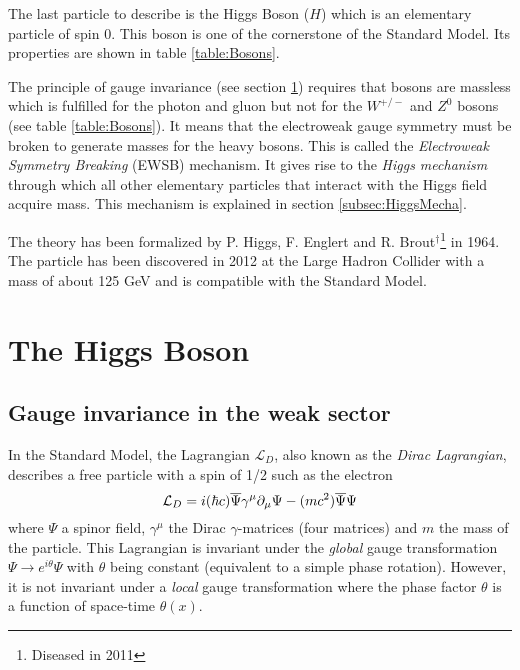 The last particle to describe is the Higgs Boson ($H$) which is an elementary particle of spin 0. This boson is one of the cornerstone of the Standard Model. Its properties are shown in table \ref{table:Bosons}.

The principle of gauge invariance (see section \ref{sec:HiggsTheo}) requires that bosons are massless which is fulfilled for the photon and gluon but not for the $W^{+/-}$ and $Z^0$ bosons (see table \ref{table:Bosons}). It means that the electroweak gauge symmetry must be broken to generate masses for the heavy bosons. This is called the \textit{Electroweak Symmetry Breaking} (EWSB) mechanism. It gives rise to the \textit{Higgs mechanism} through which all other elementary particles that interact with the Higgs field acquire mass. This mechanism is explained in section \ref{subsec:HiggsMecha}.

The theory \cite{Higgs:1964pj, Englert:1964et} has been formalized by P. Higgs, F. Englert and R. Brout$^\dagger$\footnote{Diseased in 2011} in 1964. The particle has been discovered in 2012 at the Large Hadron Collider \cite{Aad:2012tfa, Chatrchyan:2012xdj} with a mass of about 125 GeV and is compatible with the Standard Model.

\section{The Higgs Boson}
\label{sec:HiggsTheo}

\subsection{Gauge invariance in the weak sector}

In the Standard Model, the Lagrangian $\mathcal{L}_{D}$, also known as the \textit{Dirac Lagrangian}, describes a free particle with a spin of 1/2 such as the electron \cite{Griffiths:343277}
\begin{equation}
  \mathcal{L}_{D} = i(\hbar c)\overline{\rm \Psi}\gamma^{\mu}\partial_{\mu}\Psi - (mc^2)\overline{\rm \Psi}\Psi
\end{equation}
where $\Psi$ a spinor field, $\gamma^{\mu}$ the Dirac $\gamma$-matrices (four matrices) \cite{Peskin:1995ev} and $m$ the mass of the particle. This Lagrangian is invariant under the \textit{global} gauge transformation $\Psi \rightarrow e^{i\theta}\Psi$ with $\theta$ being constant (equivalent to a simple phase rotation). However, it is not invariant under a \textit{local} gauge transformation where the phase factor $\theta$ is a function of space-time $\theta(x)$.

